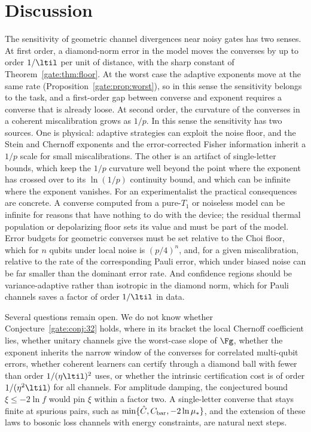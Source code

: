 \section{Discussion}\label{gate:sec:discussion}

The sensitivity of geometric channel divergences near noisy gates has two senses. At first order, a diamond-norm error in the model moves the converses by up to order $1/\ltil$ per unit of distance, with the sharp constant of Theorem~\ref{gate:thm:floor}. At the worst case the adaptive exponents move at the same rate (Proposition~\ref{gate:prop:worst}), so in this sense the sensitivity belongs to the task, and a first-order gap between converse and exponent requires a converse that is already loose.
At second order, the curvature of the converses in a coherent miscalibration grows as $1/p$. In this sense the sensitivity has two sources. One is physical: adaptive strategies can exploit the noise floor, and the Stein and Chernoff exponents and the error-corrected Fisher information inherit a $1/p$ scale for small miscalibrations. The other is an artifact of single-letter bounds, which keep the $1/p$ curvature well beyond the point where the exponent has crossed over to its $\ln(1/p)$ continuity bound, and which can be infinite where the exponent vanishes. For an experimentalist the practical consequences are concrete. A converse computed from a pure-$T_1$ or noiseless model can be infinite for reasons that have nothing to do with the device; the residual thermal population or depolarizing floor sets its value and must be part of the model. Error budgets for geometric converses must be set relative to the Choi floor, which for $n$ qubits under local noise is $(p/4)^n$, and, for a given miscalibration, relative to the rate of the corresponding Pauli error, which under biased noise can be far smaller than the dominant error rate. And confidence regions should be variance-adaptive rather than isotropic in the diamond norm, which for Pauli channels saves a factor of order $1/\ltil$ in data.

Several questions remain open. We do not know whether Conjecture~\ref{gate:conj:32} holds, where in its bracket the local Chernoff coefficient lies, whether unitary channels give the worst-case slope of $\Fg$, whether the exponent inherits the narrow window of the converses for correlated multi-qubit errors, whether coherent learners can certify through a diamond ball with fewer than order $1/(\eta\ltil)^2$ uses, or whether the intrinsic certification cost is of order $1/(\eta^2\ltil)$ for all channels. For amplitude damping, the conjectured bound $\xi\le-2\ln f$ would pin $\xi$ within a factor two. A single-letter converse that stays finite at spurious pairs, such as $\min\{\hat C,C_{\rm bar},-2\ln\mu_*\}$, and the extension of these laws to bosonic loss channels with energy constraints, are natural next steps.

